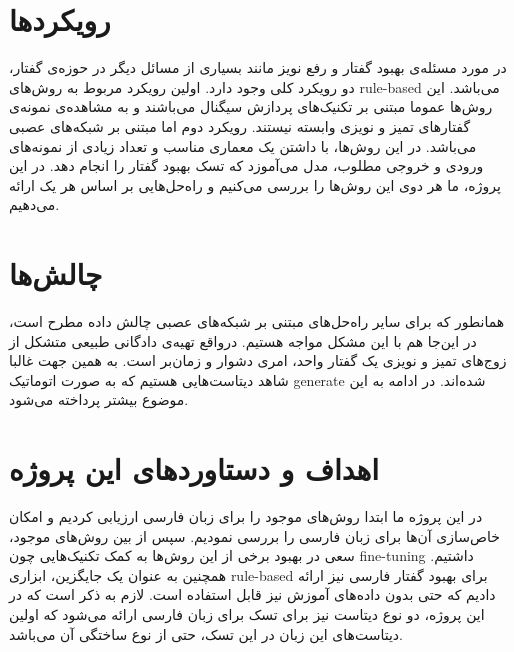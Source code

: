 \documentclass[fleqn]{report}
\begin{document}
\section{رویکردها}
در مورد مسئله‌ی بهبود گفتار و رفع نویز مانند بسیاری از مسائل دیگر در حوزه‌ی گفتار، دو رویکرد کلی وجود دارد.
اولین رویکرد مربوط به روش‌های 
rule-based می‌باشد.
این روش‌ها عموما مبتنی بر تکنیک‌های پردازش سیگنال می‌باشند و به مشاهده‌ی نمونه‌ی گفتار‌های تمیز و نویزی وابسته نیستند.
رویکرد دوم اما
مبتنی بر شبکه‌های 
عصبی می‌باشد.
در این روش‌ها، با داشتن یک معماری مناسب و تعداد زیادی از نمونه‌های ورودی و خروجی مطلوب، مدل می‌آموزد که تسک بهبود گفتار را انجام دهد.
در این پروژه، ما هر دوی این روش‌ها را بررسی می‌کنیم و راه‌حل‌هایی بر اساس هر یک ارائه می‌دهیم.

\section{چالش‌ها}
همانطور که برای سایر راه‌حل‌های مبتنی بر شبکه‌های عصبی  
چالش داده مطرح است، در این‌جا هم با این مشکل مواجه هستیم.
درواقع تهیه‌ی دادگانی طبیعی متشکل از زوج‌های تمیز و نویزی یک گفتار واحد، امری دشوار و زمان‌بر است. 
به همین جهت غالبا شاهد دیتاست‌هایی هستیم که به صورت اتوماتیک generate شده‌اند.
در ادامه به این موضوع بیشتر پرداخته می‌شود.

\section{اهداف و دستاورد‌های این پروژه}
در این پروژه ما ابتدا روش‌های موجود را برای زبان فارسی ارزیابی کردیم و امکان خاص‌سازی آن‌ها برای زبان فارسی را بررسی نمودیم.
سپس از بین روش‌های موجود، سعی در بهبود برخی از این روش‌ها به کمک تکنیک‌هایی چون fine-tuning داشتیم.
همچنین به عنوان یک جایگزین، ابزاری rule-based برای بهبود گفتار فارسی نیز ارائه دادیم که حتی بدون داده‌های آموزش نیز قابل استفاده است.
لازم به ذکر است که در این پروژه، دو نوع دیتاست نیز برای تسک  برای زبان فارسی ارائه می‌شود که  اولین دیتاست‌های این زبان در این تسک،‌ حتی از نوع ساختگی آن می‌باشد.
\end{document}
